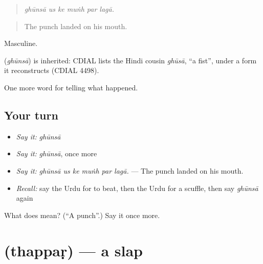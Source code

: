 \begin{quote}
     
\end{quote}

\begin{quote}
\emph{ghūnsā us ke muṅh par lagā.}
\end{quote}

\begin{quote}
The punch landed on his mouth.
\end{quote}

Masculine.

\begin{cousinweb}
\textbf{} (\emph{ghūnsā}) is inherited: CDIAL lists the Hindi cousin \emph{ghūsā}, \textquotedblleft{}a fist\textquotedblright{}, under a form it reconstructs (CDIAL 4498).
\end{cousinweb}

\begin{grammarlens}[title={What you've built}]
One more word for telling what happened.
\end{grammarlens}

\subsection*{Your turn}
\begin{itemize}
\raggedright
  \item \emph{Say it:} \emph{ghūnsā}
  \item \emph{Say it:} \emph{ghūnsā}, once more
  \item \emph{Say it:} \emph{ghūnsā us ke muṅh par lagā.} — The punch landed on his mouth.
  \item \emph{Recall:} say the Urdu for to beat, then the Urdu for a scuffle, then say \emph{ghūnsā} again
\end{itemize}

\begin{tcolorbox}[breakable,colback=teal!4,colframe=teal!35!black,title={Before you move on}]
What does  mean? (\textquotedblleft{}A punch\textquotedblright{}.) Say it once more.
\end{tcolorbox}
\section[\texorpdfstring{\ur{تھپڑ} (thappaṛ)}{تھپڑ (thappaṛ)}]{ (thappaṛ) — a slap}

\label{lesson:UR-C307-thappar}



